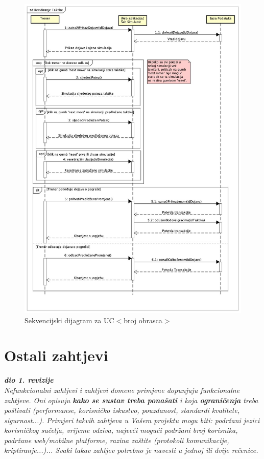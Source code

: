 				\begin{figure}[H]
        					\includegraphics[scale=0.38]{dijagrami/RevidiranjeTaktike.jpg} %
        					\centering
        					\caption{Sekvencijski dijagram za UC$<$broj obrasca$>$}
        					\label{fig:UC$<$broj obrasca$>$}
				\end{figure}
				
				\eject
	
		\section{Ostali zahtjevi}
		
			\textbf{\textit{dio 1. revizije}}\\
			
			\textit{Nefunkcionalni zahtjevi i zahtjevi domene primjene dopunjuju funkcionalne zahtjeve. Oni opisuju \textbf{kako se sustav treba ponašati} i koja \textbf{ograničenja} treba poštivati (performanse, korisničko iskustvo, pouzdanost, standardi kvalitete, sigurnost...). Primjeri takvih zahtjeva u Vašem projektu mogu biti: podržani jezici korisničkog sučelja, vrijeme odziva, najveći mogući podržani broj korisnika, podržane web/mobilne platforme, razina zaštite (protokoli komunikacije, kriptiranje...)... Svaki takav zahtjev potrebno je navesti u jednoj ili dvije rečenice.}
			
